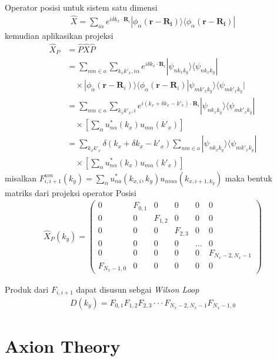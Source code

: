 Operator posisi untuk sistem satu dimensi
\begin{align}
  \hat{X} = \sum_{i\alpha} e^{i\delta k_x \cdot \mathbf{R}_i} |\phi_\alpha(\mathbf{r - R_i}) \rangle \langle \phi_\alpha(\mathbf{r - R_i})|
\end{align}
kemudian aplikasikan projeksi
\begin{align}
\hat{X}_P &= \hat{P}\hat{X}\hat{P} \\
&= \sum_{nm \in o} \sum_{k_x k'_x, i\alpha} e^{i \delta k_x \cdot \mathbf{R}_i} |\psi_{nk_x k_y}\rangle \langle \psi_{nk_x k_y}| \\
&\quad \times |\phi_\alpha(\mathbf{r} - \mathbf{R}_i)\rangle \langle \phi_\alpha(\mathbf{r} - \mathbf{R}_i) | \psi_{mk'_x k_y} \rangle \langle \psi_{mk'_x k_y}| \\
&= \sum_{nm \in o} \sum_{k_x k'_x, i} e^{i(k_x + \delta k_x - k'_x) \cdot \mathbf{R}_i} |\psi_{nk_x k_y}\rangle \langle \psi_{mk'_x k_y}| \\
&\quad \times \left[ \sum_\alpha u^*_{n\alpha}(k_x) u_{m\alpha}(k'_x) \right] \\
&= \sum_{k_x k'_x} \delta(k_x + \delta k_x - k'_x) \sum_{nm \in o} |\psi_{nk_x k_y}\rangle \langle \psi_{mk'_x k_y}| \\
&\quad \times \left[ \sum_\alpha u^*_{n\alpha}(k_x) u_{m\alpha}(k'_x) \right]
\end{align}
misalkan $F_{i,i+1}^{nm}(k_y) = \sum_\alpha u^*_{na}(k_{x,i},k_y)u_{nm\alpha}(k_{x,i+1, k_y})$ maka bentuk matriks dari projeksi operator Posisi
\begin{align}
  \hat{X}_P(k_y) = \begin{pmatrix}
0 & F_{0,1} & 0 & 0 & 0 & 0 \\
0 & 0 & F_{1,2} & 0 & 0 & 0 \\
0 & 0 & 0 & F_{2,3} & 0 & 0 \\
0 & 0 & 0 & 0 & \dots & 0 \\
0 & 0 & 0 & 0 & 0 & F_{N_x-2, N_x-1} \\
F_{N_x-1, 0} & 0 & 0 & 0 & 0 & 0
\end{pmatrix}
\end{align}

Produk dari $F_{i, i+1}$ dapat disusun sebgai \textit{Wilson Loop}
\begin{align}
	D(k_y) = F_{0,1}F_{1,2}F_{2,3} \cdot \cdot \cdot F_{N_x - 2, N_x -1}F_{N_x -1,0}
\end{align}
\section{Axion Theory}
